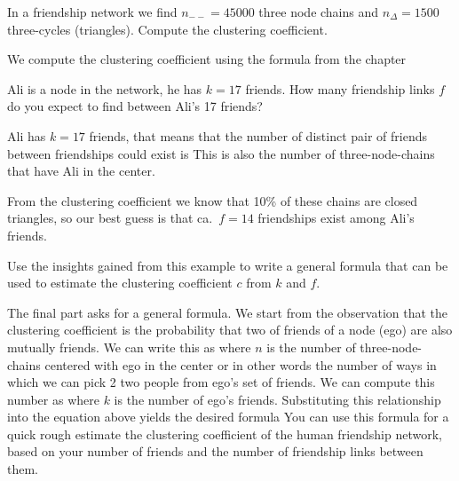 
In a friendship network we find $n_{--}=45000$ three node chains and $n_{\Delta}=1500$ three-cycles (triangles). 
\subquestion Compute the clustering coefficient. 

\solution
We compute the clustering coefficient using the formula from the chapter

\subquestion Ali is a node in the network, he has $k=17$ friends. How many friendship links $f$ do you expect to find between Ali's 17 friends? 

\solution
Ali has $k= 17$ friends, that means that the number of distinct pair of friends between friendships could exist is 
This is also the number of three-node-chains that have Ali in the center. 

From the clustering coefficient we know that 10\% of these chains are closed triangles, so our best guess is that ca.~$f=14$ friendships exist among Ali's friends.

\subquestion Use the insights gained from this example to write a general formula that can be used to estimate the clustering coefficient $c$ from $k$ and $f$.    

\solution
The final part asks for a general formula. We start from the observation that the clustering coefficient is the probability that two of friends of a node (ego) are also mutually friends. We can write this as 
where $n$ is the number of three-node-chains centered with ego in the center or in other words the number of ways in which we can pick 2 two people from ego's set of friends. We can compute this number as
where $k$ is the number of ego's friends. Substituting this relationship into the equation above yields the desired formula
You can use this formula for a quick rough estimate the clustering coefficient of the human friendship network, based on your number of friends and the number of friendship links between them. 
